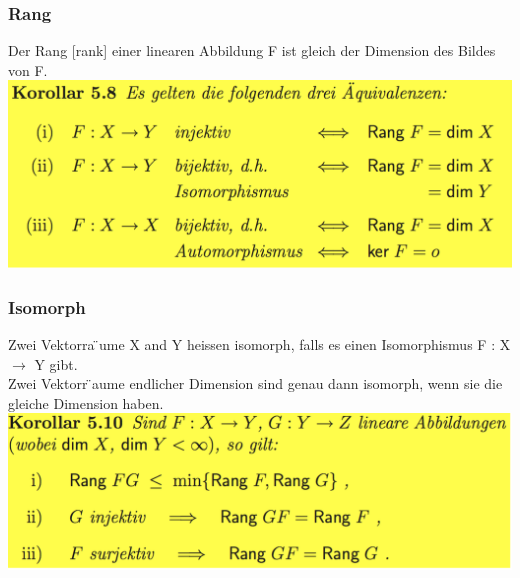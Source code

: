 \documentclass[11pt]{article}
\newcommand\back[1][-3cm]{\hspace*{#1}}
\begin{document}
\subsubsection{Rang}
Der Rang [rank] einer linearen Abbildung F ist gleich der Dimension des Bildes von F.\\
\back\includegraphics{images/rang}
\subsubsection{Isomorph}
Zwei Vektorra ̈ume X and Y heissen isomorph, falls es einen Isomorphismus F : X $\rightarrow$ Y gibt.\\
Zwei Vektorr ̈aume endlicher Dimension sind genau dann isomorph, wenn sie die gleiche Dimension haben.\\
\back\includegraphics{images/iso}\\
\end{document}
